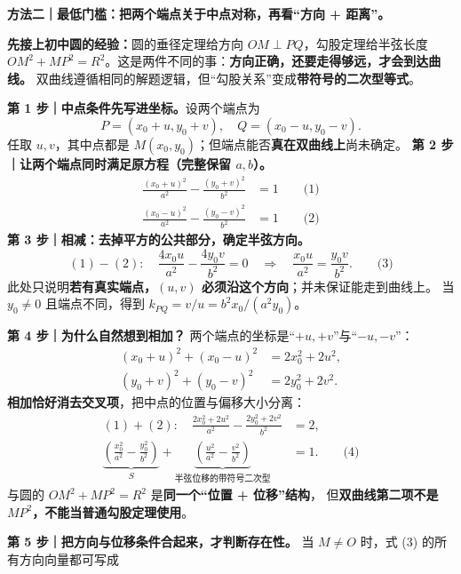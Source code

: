 \clearpage
\begin{proofbox}
\textbf{方法二｜最低门槛：把两个端点关于中点对称，再看``方向 + 距离''。}
\par\smallskip\noindent
\textbf{先接上初中圆的经验：}圆的垂径定理给方向 $OM\perp PQ$，勾股定理给半弦长度
$OM^2+MP^2=R^2$。这是两件不同的事：\textbf{方向正确，还要走得够远，才会到达曲线。}
双曲线遵循相同的解题逻辑，但``勾股关系''变成\textbf{带符号的二次型等式}。
\begin{center}\end{center}
\textbf{第 1 步｜中点条件先写进坐标。}设两个端点为
\[
\boxed{P=(x_0+u,y_0+v),\quad Q=(x_0-u,y_0-v)}.
\]
任取 $u,v$，其中点都是 $M(x_0,y_0)$；但端点能否\textbf{真在双曲线上}尚未确定。
\textbf{第 2 步｜让两个端点同时满足原方程（完整保留 $a,b$）。}
\[
\begin{aligned}
\frac{(x_0+u)^2}{a^2}-\frac{(y_0+v)^2}{b^2}&=1\qquad\text{(1)}\\[3pt]
\frac{(x_0-u)^2}{a^2}-\frac{(y_0-v)^2}{b^2}&=1\qquad\text{(2)}
\end{aligned}
\]
\textbf{第 3 步｜相减：去掉平方的公共部分，确定半弦方向。}
\[
(1)-(2):\quad \frac{4x_0u}{a^2}-\frac{4y_0v}{b^2}=0
\quad\Longrightarrow\quad
\boxed{\frac{x_0u}{a^2}=\frac{y_0v}{b^2}}.\qquad\text{(3)}
\]
此处只说明\textbf{若有真实端点，$(u,v)$ 必须沿这个方向}；并未保证能走到曲线上。
当 $y_0\ne0$ 且端点不同，得到 $k_{PQ}=v/u=b^2x_0/(a^2y_0)$。
\par\smallskip\noindent
\textbf{第 4 步｜为什么自然想到相加？}
两个端点的坐标是``$+u,+v$''与``$-u,-v$''：
\[
\begin{aligned}
(x_0+u)^2+(x_0-u)^2&=2x_0^2+2u^2,\\
(y_0+v)^2+(y_0-v)^2&=2y_0^2+2v^2.
\end{aligned}
\]
\textbf{相加恰好消去交叉项}，把中点的位置与偏移大小分离：
\[
\begin{aligned}
(1)+(2):\quad
\frac{2x_0^2+2u^2}{a^2}-\frac{2y_0^2+2v^2}{b^2}&=2,\\
\boxed{\underbrace{\left(\frac{x_0^2}{a^2}-\frac{y_0^2}{b^2}\right)}_{S}
+\underbrace{\left(\frac{u^2}{a^2}-\frac{v^2}{b^2}\right)}_{\text{半弦位移的带符号二次型}}}&=1.\qquad\text{(4)}
\end{aligned}
\]
与圆的 $OM^2+MP^2=R^2$ 是\textbf{同一个``位置 + 位移''结构}，
但\textbf{双曲线第二项不是 $MP^2$，不能当普通勾股定理使用}。
\par\smallskip\noindent
\textbf{第 5 步｜把方向与位移条件合起来，才判断存在性。}
当 $M\ne O$ 时，式 (3) 的所有方向向量都可写成

\end{proofbox}
